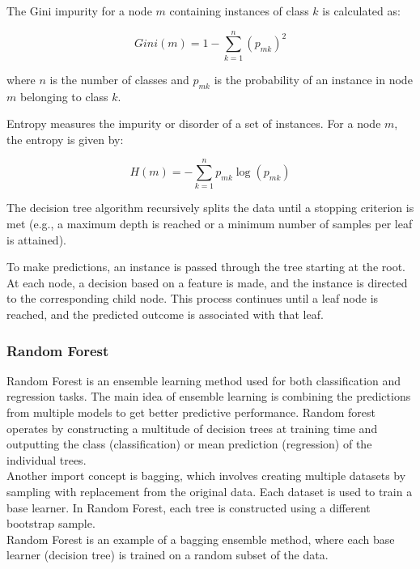 The Gini impurity for a node \(m\) containing instances of class \(k\) is calculated as:

\begin{equation*}
    Gini(m) = 1 - \sum_{k=1}^{n} (p_{mk})^2
\end{equation*}

where \(n\) is the number of classes and \(p_{mk}\) is the probability of an instance in node \(m\) belonging to class \(k\).

Entropy measures the impurity or disorder of a set of instances. For a node \(m\), the entropy is given by:

\begin{equation*}
    H(m) = -\sum_{k=1}^{n} p_{mk} \log(p_{mk})
\end{equation*}

The decision tree algorithm recursively splits the data until a stopping criterion is met (e.g., a maximum depth is reached or a minimum number of samples per leaf is attained).

To make predictions, an instance is passed through the tree starting at the root. At each node, a decision based on a feature is made, and the instance is directed to the corresponding child node. This process continues until a leaf node is reached, and the predicted outcome is associated with that leaf.

\subsubsection{Random Forest}

Random Forest is an ensemble learning method used for both classification and regression tasks. The main idea of ensemble learning is combining the predictions from multiple models to get better predictive performance. Random forest operates by constructing a multitude of decision trees at training time and outputting the class (classification) or mean prediction (regression) of the individual trees.\\

Another import concept is bagging, which involves creating multiple datasets by sampling with replacement from the original data. Each dataset is used to train a base learner. In Random Forest, each tree is constructed using a different bootstrap sample.\\

 Random Forest is an example of a bagging ensemble method, where each base learner (decision tree) is trained on a random subset of the data.\\


